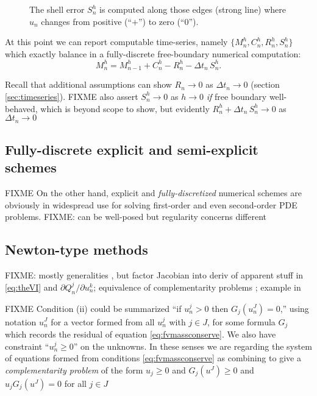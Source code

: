 \documentclass[final,leqno,onefignum,onetabnum]{siamltex1213bueler}
\begin{document}
\begin{figure}[ht]
\begin{center}

\end{center}
\caption{The shell error $S_n^h$ is computed along those edges (strong line) where $u_n$ changes from positive (``$+$'') to zero (``$0$'').}
\label{fig:fvmesh-shellerror}
\end{figure}

At this point we can report computable time-series, namely $\{M_n^h,C_n^h,R_n^h,S_n^h\}$ which exactly balance in a fully-discrete free-boundary numerical computation:
\begin{equation}
  M_n^h = M_{n-1}^h + C_n^h - R_n^h - \Delta t_n\,S_n^h. \label{eq:fvfinalbalance}
\end{equation}

Recall that additional assumptions can show $R_n\to 0$ as $\Delta t_n\to 0$ (section \ref{sec:timeseries}).  FIXME also assert $S_n^h\to 0$ as $h\to 0$ \emph{if} free boundary well-behaved, which is beyond scope to show, but evidently $R_n^h + \Delta t_n\,S_n^h \to 0$ as $\Delta t_n\to 0$

\subsection{Fully-discrete explicit and semi-explicit schemes} \label{subsec:spaceexplicit}
FIXME  On the other hand, explicit and \emph{fully-discretized} numerical schemes are obviously in widespread use for solving first-order and even second-order PDE problems.  FIXME:  can be well-posed but regularity concerns different

\subsection{Newton-type methods} \label{subsec:newtonvi}  FIXME: mostly generalities \cite{Kelley2003}, but factor Jacobian into deriv of apparent stuff in \eqref{eq:theVI} and $\partial Q_n^j/\partial u_n^k$; equivalence of complementarity problems \cite{BensonMunson2006,BillupsMurty2000}; example in \cite{Bueler2016}

FIXME Condition (ii) could be summarized ``if $u_n^j>0$ then $G_j(u_n^J)=0$,'' using notation $u_n^J$ for a vector formed from all $u_n^j$ with $j\in J$, for some formula $G_j$ which records the residual of equation \eqref{eq:fvmassconserve}.  We also have constraint ``$u_n^j\ge 0$'' on the unknowns.  In these senses we are regarding the system of equations formed from conditions \eqref{eq:fvmassconserve} as combining to give a \emph{complementarity problem} \cite{BillupsMurty2000} of the form $u_j\ge 0$ and $G_j(u^J)\ge 0$ and $u_j G_j(u^J)=0$ for all $j\in J$
\end{document}
